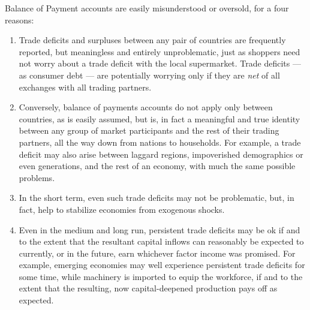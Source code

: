 \documentclass[11pt,a4paper,oneside,openright]{article}
\begin{document}
Balance of Payment accounts are easily misunderstood or oversold, for a four reasons:
\begin{enumerate}
	\item Trade deficits and surpluses between any pair of countries are frequently reported, but meaningless and entirely unproblematic, just as shoppers need not worry about a trade deficit with the local supermarket. 
	Trade deficits --- as consumer debt --- are potentially worrying only if they are \emph{net} of all exchanges with all trading partners.
	\item Conversely, balance of payments accounts do not apply  only between countries, as is easily assumed, but is, in fact a meaningful and true identity between any group of market participants and the rest of their trading partners, all the way down from nations to households. 
	For example, a trade deficit may also arise between laggard regions, impoverished demographics or even generations, and the rest of an economy, with much the same possible problems.
	\item In the short term, even such trade deficits may not be problematic, but, in fact, help to stabilize economies from exogenous shocks. 
	\item Even in the medium and long run, persistent trade deficits may be ok if and to the extent that the resultant capital inflows can reasonably be expected to currently, or in the future, earn whichever factor income was promised. 
	For example, emerging economies may well experience persistent trade deficits for some time, while machinery is imported to equip the workforce, if and to the extent that the resulting, now capital-deepened production pays off as expected.
\end{enumerate}
\end{document}
